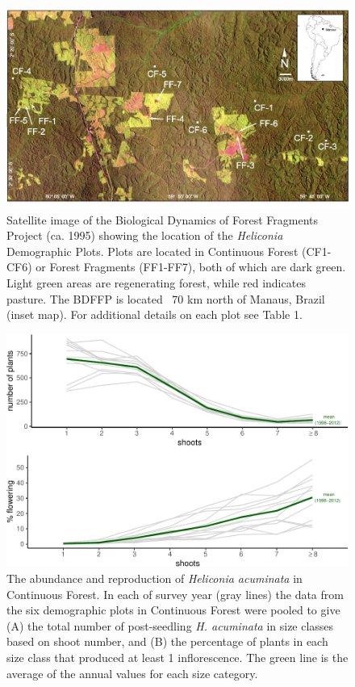 \documentclass[
  12pt,
  man, donotrepeattitle,floatsintext]{apa6}
\begin{document}
\endgroup

\newpage

\begin{figure}[h]
\includegraphics[width=1\linewidth]{Bruna_etal_MetadataS1_files/figure-latex/map-1} \caption{Satellite image of the Biological Dynamics of Forest Fragments Project (ca. 1995) showing the location of the \textit{Heliconia} Demographic Plots. Plots are located in Continuous Forest (CF1-CF6) or Forest Fragments (FF1-FF7), both of which are dark green. Light green areas are regenerating forest, while red indicates pasture. The BDFFP is located ~70 km north of Manaus, Brazil (inset map). For additional details on each plot see Table 1.}\label{fig:map}
\end{figure}

\newpage

\begin{figure}
\centering
\includegraphics{Bruna_etal_MetadataS1_files/figure-latex/repro-1.pdf}
\caption{\label{fig:repro}The abundance and reproduction of \textit{Heliconia acuminata} in Continuous Forest. In each of survey year (gray lines) the data from the six demographic plots in Continuous Forest were pooled to give (A) the total number of post-seedling \textit{H. acuminata} in size classes based on shoot number, and (B) the percentage of plants in each size class that produced at least 1 inflorescence. The green line is the average of the annual values for each size category.}
\end{figure}
\end{document}
